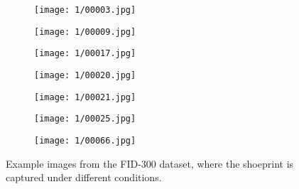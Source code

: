 \documentclass[draft,final]{vutinfth} %
\begin{document}
\begin{figure}[h]
  \centering
  \begin{subfigure}[t]{0.13\columnwidth}
    \centering
    \texttt{[image: 1/00003.jpg]}
	\caption{}
	\label{fig:int:varying:3}
  \end{subfigure}
   \begin{subfigure}[t]{0.13\columnwidth}
    \centering
    \texttt{[image: 1/00009.jpg]}
	\caption{}
	\label{fig:int:varying:9}
  \end{subfigure}
 \begin{subfigure}[t]{0.13\columnwidth}
    \centering
    \texttt{[image: 1/00017.jpg]}
	\caption{}
	\label{fig:int:varying:17}
  \end{subfigure}
 \begin{subfigure}[t]{0.13\columnwidth}
    \centering
    \texttt{[image: 1/00020.jpg]}
	\caption{}
	\label{fig:int:varying:20}
  \end{subfigure}
 \begin{subfigure}[t]{0.13\columnwidth}
    \centering
    \texttt{[image: 1/00021.jpg]}
	\caption{}
	\label{fig:int:varying:21}
  \end{subfigure}
 \begin{subfigure}[t]{0.13\columnwidth}
    \centering
    \texttt{[image: 1/00025.jpg]}
	\caption{}
	\label{fig:int:varying:25}
  \end{subfigure}
 \begin{subfigure}[t]{0.13\columnwidth}
    \centering
    \texttt{[image: 1/00066.jpg]}
	\caption{}
	\label{fig:int:varying:66}
  \end{subfigure}
  \caption{Example images from the FID-300 \cite{kortylewski2014unsupervised} dataset, where the shoeprint is captured under different conditions.}
  \label{fig:int:varying}
\end{figure}
\end{document}
